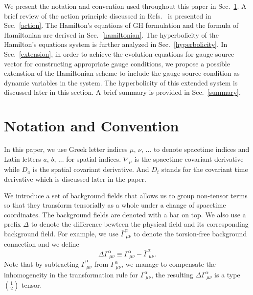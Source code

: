 \documentclass[letterpaper,nofootinbib,prd,amsmath,onecolumn]{revtex4-1}
\begin{document}
We present the notation and convention used throughout this paper in Sec.~\ref{notation}. A brief review of the action principle discussed in Refs.~\cite{Brown:2010rya} is presented in Sec.~\ref{action}. The Hamilton's equations of GH formulation and the formula of Hamiltonian are derived in Sec.~\ref{hamiltonian}. The hyperbolicity of the Hamilton's equations system is further analyzed in Sec.~\ref{hyperbolicity}. In Sec.~\ref{extension}, in order to achieve the evolution equations for gauge source vector for constructing appropriate gauge conditions, we propose a possible extenstion of the Hamiltonian scheme to include the gauge source condition as dynamic variables in the system. The hyperbolicity of this extended system is discussed later in this section. A brief summary is provided in Sec.~\ref{summary}. 
\section{Notation and Convention}\label{notation}
In this paper, we use Greek letter indices $\mu$, $\nu$, ... to denote spacetime indices and Latin letters $a$, $b$, ... for spatial indices. $\nabla_{\mu}$ is the spacetime covariant derivative while $D_{a}$ is the spatial covariant derivative. And $D_{t}$ stands for the covariant time derivative\cite{Meng} which is discussed later in the paper.

We introduce a set of background fields that allows us to group non-tensor terms so that they transform tensorially as a whole under a change of spacetime coordinates. The background fields are denoted with a bar on top. We also use a prefix $\Delta$ to denote the difference bewteen the physical field and its corresponding background field. For example, we use ${\bar \Gamma}^{\alpha}_{~\mu\nu}$ to denote the torsion-free background connection and we define
\begin{equation}
\Delta \Gamma^{\alpha}_{~\mu\nu} \equiv \Gamma^{\alpha}_{~\mu\nu} - {\bar \Gamma}^{\alpha}_{~\mu\nu}.
\end{equation}
Note that by subtracting ${\bar \Gamma}^{\alpha}_{~\mu\nu}$ from $\Gamma^{\alpha}_{~\mu\nu}$, we manage to compensate the inhomogeneity in the transformation rule for $\Gamma^{\alpha}_{~\mu\nu}$, the resulting $\Delta \Gamma^{\alpha}_{~\mu\nu}$ is a type ${1}\choose{2}$ tensor.  
\end{document}
